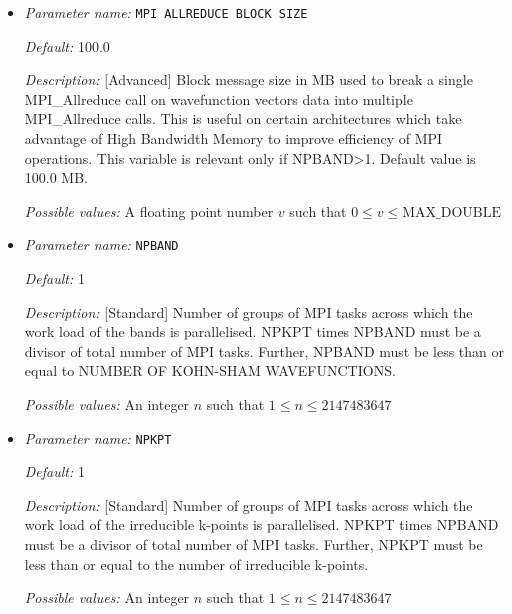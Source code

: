 \begin{itemize}
\item {\it Parameter name:} {\tt MPI ALLREDUCE BLOCK SIZE}
\label{parameters:Parallelization/MPI ALLREDUCE BLOCK SIZE}
\label{parameters:Parallelization/MPI_20ALLREDUCE_20BLOCK_20SIZE}




{\it Default:} 100.0


{\it Description:} [Advanced] Block message size in MB used to break a single MPI\_Allreduce call on wavefunction vectors data into multiple MPI\_Allreduce calls. This is useful on certain architectures which take advantage of High Bandwidth Memory to improve efficiency of MPI operations. This variable is relevant only if NPBAND>1. Default value is 100.0 MB.


{\it Possible values:} A floating point number $v$ such that $0 \leq v \leq \text{MAX\_DOUBLE}$
\item {\it Parameter name:} {\tt NPBAND}
\label{parameters:Parallelization/NPBAND}




{\it Default:} 1


{\it Description:} [Standard] Number of groups of MPI tasks across which the work load of the bands is parallelised. NPKPT times NPBAND must be a divisor of total number of MPI tasks. Further, NPBAND must be less than or equal to NUMBER OF KOHN-SHAM WAVEFUNCTIONS.


{\it Possible values:} An integer $n$ such that $1\leq n \leq 2147483647$
\item {\it Parameter name:} {\tt NPKPT}
\label{parameters:Parallelization/NPKPT}




{\it Default:} 1


{\it Description:} [Standard] Number of groups of MPI tasks across which the work load of the irreducible k-points is parallelised. NPKPT times NPBAND must be a divisor of total number of MPI tasks. Further, NPKPT must be less than or equal to the number of irreducible k-points.


{\it Possible values:} An integer $n$ such that $1\leq n \leq 2147483647$
\end{itemize}

